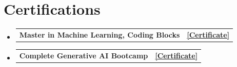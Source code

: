 \documentclass[letterpaper,9pt]{article}
\makeatletter
\newcommand{\resumeProjectHeading}[2]{
  \item
    \begin{tabular*}{\textwidth}{l@{\extracolsep{\fill}}r}
      \small #1 & \textbf{\small #2}\\
    \end{tabular*}\vspace{-6pt}
}
\newcommand{\resumeSubHeadingListStart}{\begin{itemize}[leftmargin=0.0in,label={},itemsep=4pt,topsep=2pt]}
\newcommand{\resumeSubHeadingListEnd}{\end{itemize}}
\makeatother
\begin{document}
\section{Certifications}
  \resumeSubHeadingListStart
    \resumeProjectHeading{\textbf{Master in Machine Learning, Coding Blocks}}{\href{https://online.codingblocks.com/app/certificates/CBOL-299010-ae37babb}{[Certificate]}}
    \resumeProjectHeading{\textbf{Complete Generative AI Bootcamp}}{\href{https://www.udemy.com/certificate/UC-f6bef3c0-4c25-4c03-afe6-cdacd43940cf/}{[Certificate]}}
  \resumeSubHeadingListEnd
\end{document}
